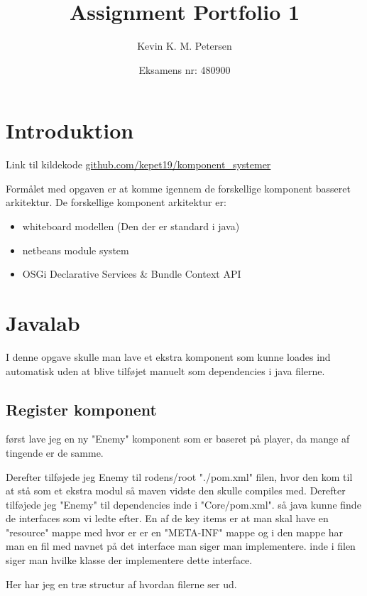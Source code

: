 \title{Assignment Portfolio 1}
\author{Kevin K. M. Petersen \and Eksamens nr: 480900}
\maketitle

\section{Introduktion}
Link til kildekode \href{https://github.com/kepet19/komponent_systemer}{github.com/kepet19/komponent\_systemer}

Formålet med opgaven er at komme igennem de forskellige komponent basseret
arkitektur. De forskellige komponent arkitektur er: 


\begin{itemize}
 \item whiteboard modellen (Den der er standard i java)
 \item netbeans module system
 \item OSGi {Declarative Services \& Bundle Context API}
\end{itemize}

\section{Javalab}
I denne opgave skulle man lave et ekstra komponent som kunne loades ind
automatisk uden at blive tilføjet manuelt som dependencies i java filerne.

\subsection{Register komponent}
først lave jeg en ny "Enemy" komponent som er baseret på player, da mange af
tingende er de samme. 

Derefter tilføjede jeg Enemy til rodens/root "./pom.xml" filen, hvor den kom
til at stå som et ekstra modul så maven vidste den skulle compiles med.
Derefter tilføjede jeg "Enemy" til dependencies inde i "Core/pom.xml". så java
kunne finde de interfaces som vi ledte efter.  En af de key items er at man
skal have en "resource" mappe med hvor er er en "META-INF" mappe og i den mappe
har man en fil med navnet på det interface man siger man implementere. inde i filen
siger man hvilke klasse der implementere dette interface.

Her har jeg en træ structur af hvordan filerne ser ud.

